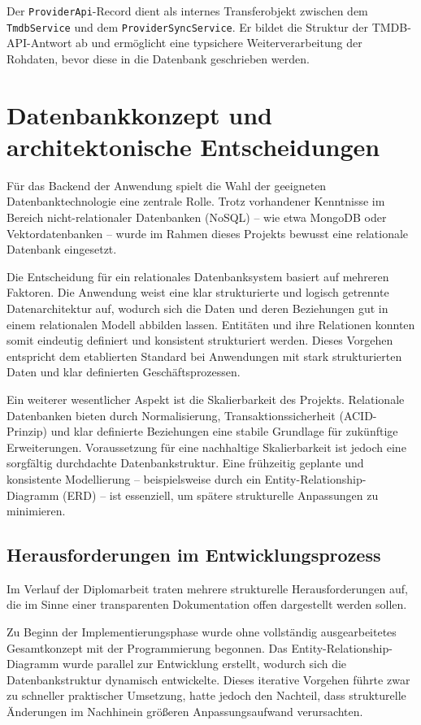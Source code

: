 Der \texttt{ProviderApi}-Record dient als internes Transferobjekt zwischen
dem \texttt{TmdbService} und dem \texttt{ProviderSyncService}. Er bildet
die Struktur der TMDB-API-Antwort ab und ermöglicht eine typsichere
Weiterverarbeitung der Rohdaten, bevor diese in die Datenbank geschrieben
werden.

\section{Datenbankkonzept und architektonische Entscheidungen}

Für das Backend der Anwendung spielt die Wahl der geeigneten Datenbanktechnologie
eine zentrale Rolle. Trotz vorhandener Kenntnisse im Bereich nicht-relationaler
Datenbanken (NoSQL) -- wie etwa MongoDB oder Vektordatenbanken -- wurde im Rahmen
dieses Projekts bewusst eine relationale Datenbank eingesetzt.

Die Entscheidung für ein relationales Datenbanksystem basiert auf mehreren Faktoren.
Die Anwendung weist eine klar strukturierte und logisch getrennte Datenarchitektur
auf, wodurch sich die Daten und deren Beziehungen gut in einem relationalen Modell
abbilden lassen. Entitäten und ihre Relationen konnten somit eindeutig definiert
und konsistent strukturiert werden. Dieses Vorgehen entspricht dem etablierten
Standard bei Anwendungen mit stark strukturierten Daten und klar definierten
Geschäftsprozessen.

Ein weiterer wesentlicher Aspekt ist die Skalierbarkeit des Projekts. Relationale
Datenbanken bieten durch Normalisierung, Transaktionssicherheit (ACID-Prinzip) und
klar definierte Beziehungen eine stabile Grundlage für zukünftige Erweiterungen.
Voraussetzung für eine nachhaltige Skalierbarkeit ist jedoch eine sorgfältig
durchdachte Datenbankstruktur. Eine frühzeitig geplante und konsistente Modellierung
-- beispielsweise durch ein Entity-Relationship-Diagramm (ERD) -- ist essenziell,
um spätere strukturelle Anpassungen zu minimieren.


\subsection{Herausforderungen im Entwicklungsprozess}

Im Verlauf der Diplomarbeit traten mehrere strukturelle Herausforderungen auf, die
im Sinne einer transparenten Dokumentation offen dargestellt werden sollen.

Zu Beginn der Implementierungsphase wurde ohne vollständig ausgearbeitetes
Gesamtkonzept mit der Programmierung begonnen. Das Entity-Relationship-Diagramm
wurde parallel zur Entwicklung erstellt, wodurch sich die Datenbankstruktur
dynamisch entwickelte. Dieses iterative Vorgehen führte zwar zu schneller
praktischer Umsetzung, hatte jedoch den Nachteil, dass strukturelle Änderungen
im Nachhinein größeren Anpassungsaufwand verursachten.

